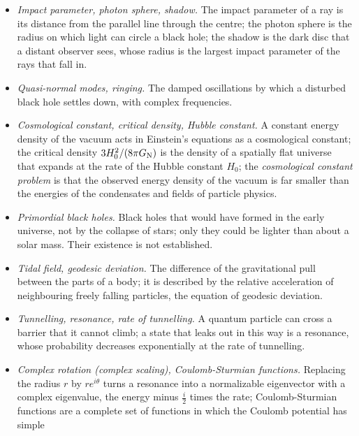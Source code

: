 \documentclass[
  10pt,
]{article}
\begin{document}
\begin{itemize}
  \emph{Schwinger pair creation, critical field.} A strong static field
  creates pairs of particles and antiparticles out of the vacuum, at a
  rate that becomes large when the field reaches \(m^2/q\) (the critical
  field) for particles of mass \(m\) and charge \(q\).
\item
  \emph{Impact parameter, photon sphere, shadow.} The impact parameter
  of a ray is its distance from the parallel line through the centre;
  the photon sphere is the radius on which light can circle a black
  hole; the shadow is the dark disc that a distant observer sees, whose
  radius is the largest impact parameter of the rays that fall in.
\item
  \emph{Quasi-normal modes, ringing.} The damped oscillations by which a
  disturbed black hole settles down, with complex frequencies.
\item
  \emph{Cosmological constant, critical density, Hubble constant.} A
  constant energy density of the vacuum acts in Einstein's equations as
  a cosmological constant; the critical density
  \(3H_0^2/(8\pi G_{\rm N})\) is the density of a spatially flat
  universe that expands at the rate of the Hubble constant \(H_0\); the
  \emph{cosmological constant problem} is that the observed energy
  density of the vacuum is far smaller than the energies of the
  condensates and fields of particle physics.
\item
  \emph{Primordial black holes.} Black holes that would have formed in
  the early universe, not by the collapse of stars; only they could be
  lighter than about a solar mass. Their existence is not established.
\item
  \emph{Tidal field, geodesic deviation.} The difference of the
  gravitational pull between the parts of a body; it is described by the
  relative acceleration of neighbouring freely falling particles, the
  equation of geodesic deviation.
\item
  \emph{Tunnelling, resonance, rate of tunnelling.} A quantum particle
  can cross a barrier that it cannot climb; a state that leaks out in
  this way is a resonance, whose probability decreases exponentially at
  the rate of tunnelling.
\item
  \emph{Complex rotation (complex scaling), Coulomb-Sturmian functions.}
  Replacing the radius \(r\) by \(re^{i\theta}\) turns a resonance into
  a normalizable eigenvector with a complex eigenvalue, the energy minus
  \(\tfrac i2\) times the rate; Coulomb-Sturmian functions are a
  complete set of functions in which the Coulomb potential has simple

\end{itemize}
\end{document}

